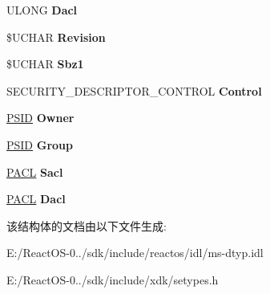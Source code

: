 \begin{DoxyCompactItemize}
U\+L\+O\+NG {\bfseries Dacl}
\item 
\mbox{\label{struct___s_e_c_u_r_i_t_y___d_e_s_c_r_i_p_t_o_r_a3c40d59a8ff758c4ab73da69545c8a52}} 
\$U\+C\+H\+AR {\bfseries Revision}
\item 
\mbox{\label{struct___s_e_c_u_r_i_t_y___d_e_s_c_r_i_p_t_o_r_aec6bf776f60cc476a9e875b04bca712a}} 
\$U\+C\+H\+AR {\bfseries Sbz1}
\item 
\mbox{\label{struct___s_e_c_u_r_i_t_y___d_e_s_c_r_i_p_t_o_r_aedf674c652a73f50f9a896b2497f1409}} 
S\+E\+C\+U\+R\+I\+T\+Y\+\_\+\+D\+E\+S\+C\+R\+I\+P\+T\+O\+R\+\_\+\+C\+O\+N\+T\+R\+OL {\bfseries Control}
\item 
\mbox{\label{struct___s_e_c_u_r_i_t_y___d_e_s_c_r_i_p_t_o_r_a70c93c5c3fa5b26ae1cee641896d9b0e}} 
\hyperlink{struct___s_i_d}{P\+S\+ID} {\bfseries Owner}
\item 
\mbox{\label{struct___s_e_c_u_r_i_t_y___d_e_s_c_r_i_p_t_o_r_aed1f892c4fab4b52b60ac0e13a412036}} 
\hyperlink{struct___s_i_d}{P\+S\+ID} {\bfseries Group}
\item 
\mbox{\label{struct___s_e_c_u_r_i_t_y___d_e_s_c_r_i_p_t_o_r_a0c558ea93c3789c077e444ae677f4d6e}} 
\hyperlink{struct___a_c_l}{P\+A\+CL} {\bfseries Sacl}
\item 
\mbox{\label{struct___s_e_c_u_r_i_t_y___d_e_s_c_r_i_p_t_o_r_a6dc4d9f0455e08f4a5158b52b6dd23fc}} 
\hyperlink{struct___a_c_l}{P\+A\+CL} {\bfseries Dacl}
\end{DoxyCompactItemize}


该结构体的文档由以下文件生成\+:\begin{DoxyCompactItemize}
\item 
E\+:/\+React\+O\+S-\/0../sdk/include/reactos/idl/ms-\/dtyp.\+idl\item 
E\+:/\+React\+O\+S-\/0../sdk/include/xdk/setypes.\+h\end{DoxyCompactItemize}
